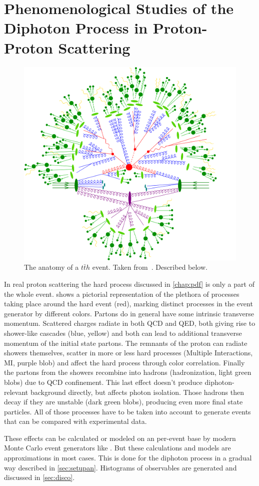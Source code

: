 \chapter{Phenomenological Studies of the Diphoton Process in Proton-Proton
  Scattering}%
\label{chap:pheno}

\begin{figure}[h!]
  \centering
  \includegraphics[width=.6\textwidth]{figs/event.pdf}
  \caption[The anatomy of a \(t\bar{t}h\) event.]{\label{fig:anatomy}
    The anatomy of a \(t\bar{t}h\) event. Taken
    from~\cite{Gleisberg:2008ta}. Described below.}
\end{figure}
%
In real proton scattering the hard process discussed in
\cref{chap:pdf} is only a part of the whole event. 
shows a pictorial representation of the plethora of processes taking
place around the hard event (red), marking distinct processes in the
event generator by different colors.  Partons do in general have some
intrinsic transverse momentum.  Scattered charges radiate in both QCD
and QED, both giving rise to shower-like cascades (blue, yellow) and
both can lead to additional transverse momentum of the initial state
partons. The remnants of the proton can radiate showers themselves,
scatter in more or less hard processes (Multiple Interactions, MI,
purple blob) and affect the hard process through color
correlation. Finally the partons from the showers recombine into
hadrons (hadronization, light green blobs) due to QCD
confinement. This last effect doesn't produce diphoton-relevant
background directly, but affects photon isolation. Those hadrons then
decay if they are unstable (dark green blobs), producing even more
final state particles. All of those processes have to be taken into
account to generate events that can be compared with experimental
data.~\cite{buckley:2011ge,Gleisberg:2008ta}

These effects can be calculated or modeled on an per-event base by
modern Monte Carlo event generators like \sherpa. But these
calculations and models are approximations in most cases. This is done
for the diphoton process in a gradual way described in
\cref{sec:setupan}. Histograms of observables are generated and
discussed in \cref{sec:disco}.

